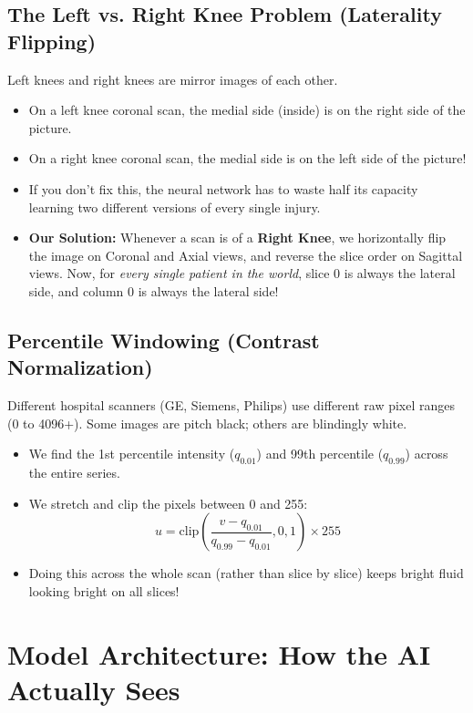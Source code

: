 \documentclass[11pt,a4paper]{article}
\begin{document}
\subsection{The Left vs. Right Knee Problem (Laterality Flipping)}
Left knees and right knees are mirror images of each other. 
\begin{itemize}[leftmargin=*]
    \item On a left knee coronal scan, the medial side (inside) is on the right side of the picture.
    \item On a right knee coronal scan, the medial side is on the left side of the picture!
    \item If you don't fix this, the neural network has to waste half its capacity learning two different versions of every single injury.
    \item \textbf{Our Solution:} Whenever a scan is of a \textbf{Right Knee}, we horizontally flip the image on Coronal and Axial views, and reverse the slice order on Sagittal views. Now, for \textit{every single patient in the world}, slice 0 is always the lateral side, and column 0 is always the lateral side!
\end{itemize}

\subsection{Percentile Windowing (Contrast Normalization)}
Different hospital scanners (GE, Siemens, Philips) use different raw pixel ranges (0 to 4096+). Some images are pitch black; others are blindingly white.
\begin{itemize}[leftmargin=*]
    \item We find the 1st percentile intensity ($q_{0.01}$) and 99th percentile ($q_{0.99}$) across the entire series.
    \item We stretch and clip the pixels between 0 and 255:
    $$u = \text{clip}\left(\frac{v - q_{0.01}}{q_{0.99} - q_{0.01}}, 0, 1\right) \times 255$$
    \item Doing this across the whole scan (rather than slice by slice) keeps bright fluid looking bright on all slices!
\end{itemize}

\newpage

\section{Model Architecture: How the AI Actually Sees}
\end{document}
